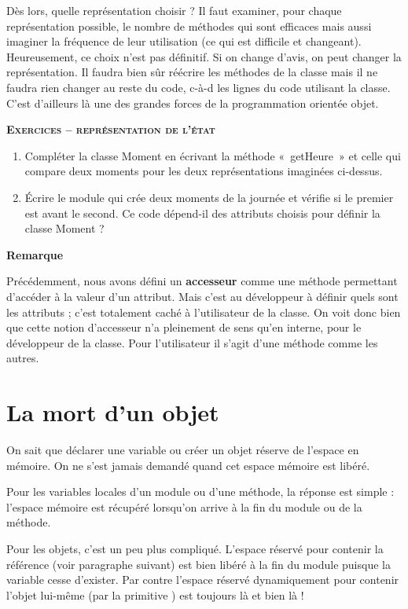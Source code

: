 {
Dès lors, quelle représentation choisir ? Il faut examiner, pour chaque
représentation possible, le nombre de méthodes qui sont efficaces mais
aussi imaginer la fréquence de leur utilisation (ce qui est difficile
et changeant). Heureusement, ce choix n'est pas
définitif. Si on change d'avis, on peut changer la
représentation. Il faudra bien sûr réécrire les méthodes de la classe
mais il ne faudra rien changer au reste du code, c-à-d les lignes du
code utilisant la classe. C’est d’ailleurs là une des grandes forces de
la programmation orientée objet.}

{\sffamily\bfseries\scshape
Exercices – représentation de l'état}

\liststyleWWviiiNumi
\begin{enumerate}
\item {
Compléter la classe Moment en écrivant la méthode «~getHeure~» et celle
qui compare deux moments pour les deux représentations imaginées
ci-dessus.}
\item {
Écrire le module qui crée deux moments de la journée et vérifie si le
premier est avant le second. Ce code dépend-il des attributs choisis
pour définir la classe Moment ?}
\end{enumerate}

\bigskip

{\bfseries
Remarque}

{
Précédemment, nous avons défini un \textbf{accesseur} comme une méthode
permettant d’accéder à la valeur d’un attribut. Mais c’est au
développeur à définir quels sont les attributs ; c’est totalement caché
à l’utilisateur de la classe. On voit donc bien que cette notion
d’accesseur n’a pleinement de sens qu’en interne, pour le développeur
de la classe. Pour l’utilisateur il s’agit d’une méthode comme les
autres.}

\section{La mort d'un objet}
{
On sait que déclarer une variable ou créer un objet réserve de l’espace
en mémoire. On ne s’est jamais demandé quand cet espace mémoire est
libéré.}

{
Pour les variables locales d’un module ou d'une
méthode, la réponse est simple : l’espace mémoire est récupéré
lorsqu’on arrive à la fin du module ou de la méthode.}

{
Pour les objets, c’est un peu plus compliqué. L’espace réservé pour
contenir la référence (voir paragraphe suivant) est bien libéré à la
fin du module puisque la variable cesse d’exister. Par contre l’espace
réservé dynamiquement pour contenir l’objet lui-même (par la primitive
) est toujours là et bien là !}

